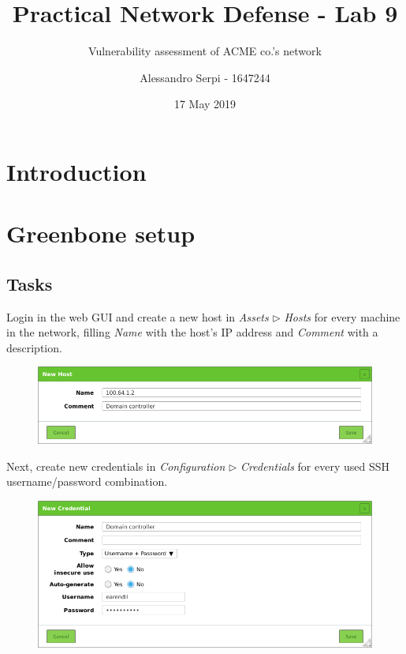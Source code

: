 \documentclass[draft]{homework}
\title{Practical Network Defense - Lab 9}
\subtitle{Vulnerability assessment of ACME co.'s network}
\author{Alessandro Serpi - 1647244}
\date{17 May 2019}
\begin{document}
    \maketitle
    \tableofcontents
    
    
    \pagebreak
    \section{Introduction}
    
    
    \section{Greenbone setup}
    
    \subsection{Tasks}
    Login in the web GUI and create a new host in \textit{Assets} $\triangleright$ \textit{Hosts} for every machine in the network, filling \textit{Name} with the host's IP address and \textit{Comment} with a description.
    \vspace{-5pt}
    \begin{figure}[H]
        \centering
        \includegraphics[width=1\linewidth]{images/new-host}
        \label{fig:new-host}
    \end{figure}
    \vspace{-20pt}
    
    Next, create new credentials in \textit{Configuration} $\triangleright$ \textit{Credentials} for every used SSH username/password combination.
    \vspace{-5pt}
    \begin{figure}[H]
        \centering
        \includegraphics[width=1\linewidth]{images/new-credentials}
        \label{fig:new-credentials}
    \end{figure}
    \vspace{-20pt}
    
\end{document}
